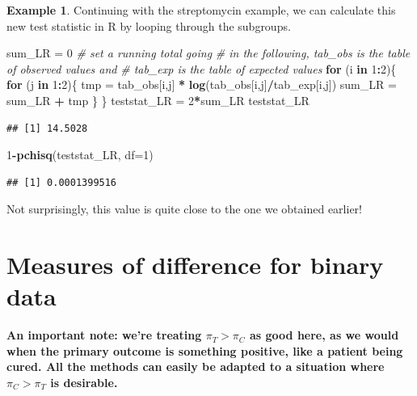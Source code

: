 \documentclass[
  openany]{book}
\newenvironment{Shaded}{\begin{snugshade}}{\end{snugshade}}
\newcommand{\AttributeTok}[1]{\textcolor[rgb]{0.13,0.29,0.53}{#1}}
\newcommand{\CommentTok}[1]{\textcolor[rgb]{0.56,0.35,0.01}{\textit{#1}}}
\newcommand{\ControlFlowTok}[1]{\textcolor[rgb]{0.13,0.29,0.53}{\textbf{#1}}}
\newcommand{\DecValTok}[1]{\textcolor[rgb]{0.00,0.00,0.81}{#1}}
\newcommand{\FunctionTok}[1]{\textcolor[rgb]{0.13,0.29,0.53}{\textbf{#1}}}
\newcommand{\NormalTok}[1]{#1}
\newcommand{\OtherTok}[1]{\textcolor[rgb]{0.56,0.35,0.01}{#1}}
\newcommand{\SpecialCharTok}[1]{\textcolor[rgb]{0.81,0.36,0.00}{\textbf{#1}}}
\theoremstyle{definition}
\theoremstyle{definition}
\newtheorem{example}{Example}[chapter]
\theoremstyle{definition}
\theoremstyle{definition}
\theoremstyle{remark}
\begin{document}
\begin{example}
Continuing with the streptomycin example, we can calculate this new test statistic in R by looping through the subgroups.

\begin{Shaded}
\begin{Highlighting}[]
\NormalTok{sum\_LR }\OtherTok{=} \DecValTok{0} \CommentTok{\# set a running total going }
\CommentTok{\# in the following, tab\_obs is the table of observed values and}
\CommentTok{\# tab\_exp is the table of expected values}
\ControlFlowTok{for}\NormalTok{ (i }\ControlFlowTok{in} \DecValTok{1}\SpecialCharTok{:}\DecValTok{2}\NormalTok{)\{}
  \ControlFlowTok{for}\NormalTok{ (j }\ControlFlowTok{in} \DecValTok{1}\SpecialCharTok{:}\DecValTok{2}\NormalTok{)\{}
\NormalTok{    tmp }\OtherTok{=}\NormalTok{ tab\_obs[i,j] }\SpecialCharTok{*} \FunctionTok{log}\NormalTok{(tab\_obs[i,j]}\SpecialCharTok{/}\NormalTok{tab\_exp[i,j])}
\NormalTok{    sum\_LR }\OtherTok{=}\NormalTok{ sum\_LR }\SpecialCharTok{+}\NormalTok{ tmp}
\NormalTok{  \}}
\NormalTok{\}}
\NormalTok{teststat\_LR }\OtherTok{=} \DecValTok{2}\SpecialCharTok{*}\NormalTok{sum\_LR}
\NormalTok{teststat\_LR}
\end{Highlighting}
\end{Shaded}

\begin{verbatim}
## [1] 14.5028
\end{verbatim}

\begin{Shaded}
\begin{Highlighting}[]
\DecValTok{1}\SpecialCharTok{{-}}\FunctionTok{pchisq}\NormalTok{(teststat\_LR, }\AttributeTok{df=}\DecValTok{1}\NormalTok{)}
\end{Highlighting}
\end{Shaded}

\begin{verbatim}
## [1] 0.0001399516
\end{verbatim}

Not surprisingly, this value is quite close to the one we obtained earlier!
\end{example}

\section{Measures of difference for binary data}\label{measures-of-difference-for-binary-data}

\textbf{An important note: we're treating \(\pi_T>\pi_C\) as good here, as we would when the primary outcome is something positive, like a patient being cured. All the methods can easily be adapted to a situation where \(\pi_C>\pi_T\) is desirable.}
\end{document}
